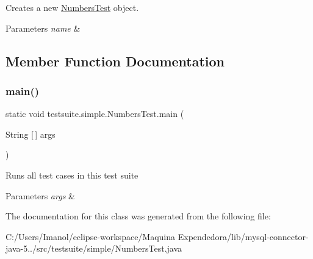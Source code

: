 Creates a new \mbox{\hyperlink{classtestsuite_1_1simple_1_1_numbers_test}{Numbers\+Test}} object.


\begin{DoxyParams}{Parameters}
{\em name} & \\
\hline
\end{DoxyParams}


\subsection{Member Function Documentation}
\mbox{\label{classtestsuite_1_1simple_1_1_numbers_test_a71ce4bec6ea91a72a2818b53e626d99b}} 
\subsubsection{\texorpdfstring{main()}{main()}}
{\footnotesize\ttfamily static void testsuite.\+simple.\+Numbers\+Test.\+main (\begin{DoxyParamCaption}\item[{String \mbox{[}$\,$\mbox{]}}]{args }\end{DoxyParamCaption})\hspace{0.3cm}{\ttfamily [static]}}

Runs all test cases in this test suite


\begin{DoxyParams}{Parameters}
{\em args} & \\
\hline
\end{DoxyParams}


The documentation for this class was generated from the following file\+:\begin{DoxyCompactItemize}
\item 
C\+:/\+Users/\+Imanol/eclipse-\/workspace/\+Maquina Expendedora/lib/mysql-\/connector-\/java-\/5../src/testsuite/simple/Numbers\+Test.\+java\end{DoxyCompactItemize}
